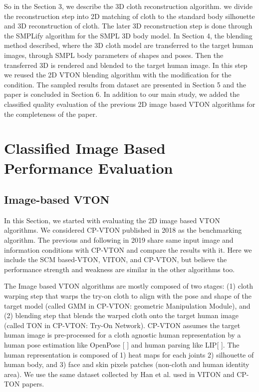 \documentclass[runningheads]{llncs}
\begin{document}
So in the Section 3, we describe the 3D cloth reconstruction algorithm. we divide the reconstruction step into 2D matching of cloth to the standard body silhouette and 3D reconstruction of cloth. The later 3D reconstruction step is done through the SMPLify algorithm for the SMPL 3D body model.  In Section 4, the blending method described, where the 3D cloth model are transferred to the target human images, through SMPL body parameters of shapes and poses. Then the transferred 3D is rendered and blended to the target human image. In this step we reused the 2D VTON blending algorithm with the modification for the condition.  The sampled results from dataset are presented in Section 5 and the paper is concluded in Section 6. In addition to our main study, we added the classified quality evaluation of the previous 2D image based VTON algorithms for the  completeness of the paper.     


\section{Classified Image Based Performance Evaluation}

\subsection{Image-based VTON}

In this Section, we started with evaluating the 2D image based VTON algorithms. We considered CP-VTON published in 2018 as the benchmarking algorithm. The previous and following in 2019 share same input image and information conditions with CP-VTON and compare the results with it. Here we include the SCM based-VTON, VITON, and  CP-VTON, but believe the performance strength and weakness are similar in the other algorithms too.


The Image based VTON algorithms are mostly composed of two stages: (1) cloth warping step that warps the try-on cloth to align with the pose and shape of the target model (called GMM in CP-VTON: geometric Manipulation Module), and (2) blending step that blends the warped cloth onto the target human image (called TON in CP-VTON: Try-On Network). CP-VTON assumes the target human image is pre-processed for a cloth agnostic human representation by a human pose estimation like OpenPose [  ] and human parsing like LIP[ ]. The human representation is composed of 1) heat maps for each joints 2) silhouette of human body, and 3) face and skin pixels patches (non-cloth and human identity area). We use the same dataset collected by Han et al. used in VITON and CP-TON papers.
 
\end{document}
